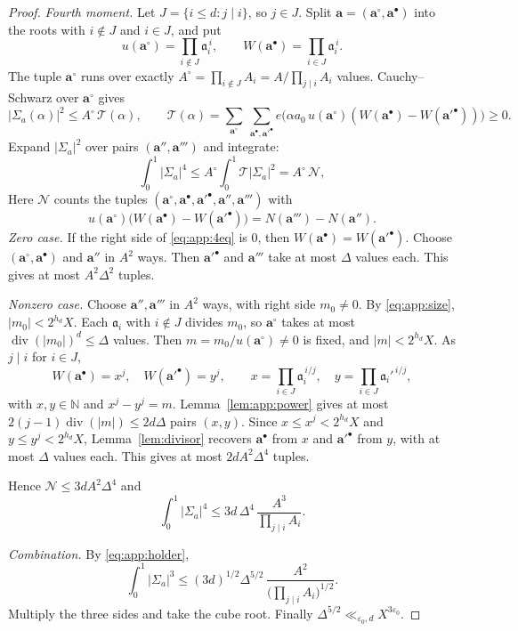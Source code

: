 \documentclass{amsart}
\theoremstyle{definition}
\theoremstyle{plain}
\numberwithin{equation}{section}
\numberwithin{table}{section}
\newcommand{\N}{\mathbb{N}}
\begin{document}
\begin{proof}
\emph{Fourth moment.} Let $J=\{i\le d:j\mid i\}$, so $j\in J$. Split
$\mathbf a=(\mathbf a^\circ,\mathbf a^\bullet)$ into the roots with
$i\notin J$ and $i\in J$, and put
\[
 u(\mathbf a^\circ)=\prod_{i\notin J}\mathfrak a_i^{\,i},\qquad
 W(\mathbf a^\bullet)=\prod_{i\in J}\mathfrak a_i^{\,i}.
\]
The tuple $\mathbf a^\circ$ runs over exactly
$A^\circ=\prod_{i\notin J}A_i=A/\prod_{j\mid i}A_i$ values. Cauchy--Schwarz
over $\mathbf a^\circ$ gives
\[
 |\Sigma_a(\alpha)|^2\le A^\circ\,\mathcal T(\alpha),\qquad
 \mathcal T(\alpha)=\sum_{\mathbf a^\circ}\
 \sum_{\mathbf a^\bullet,\mathbf a'^\bullet}
 e\bigl(\alpha a_0\,u(\mathbf a^\circ)
 (W(\mathbf a^\bullet)-W(\mathbf a'^\bullet))\bigr)\ge0 .
\]
Expand $|\Sigma_a|^2$ over pairs $(\mathbf a'',\mathbf a''')$ and
integrate:
\[
 \int_0^1|\Sigma_a|^4\le A^\circ\int_0^1\mathcal T|\Sigma_a|^2
 =A^\circ\,\mathcal N,
\]
Here $\mathcal N$ counts the tuples
$(\mathbf a^\circ,\mathbf a^\bullet,\mathbf a'^\bullet,\mathbf a'',\mathbf a''')$
with
\begin{equation}\label{eq:app:4eq}
 u(\mathbf a^\circ)\bigl(W(\mathbf a^\bullet)-W(\mathbf a'^\bullet)\bigr)
 =N(\mathbf a''')-N(\mathbf a'').
\end{equation}
\emph{Zero case.} If the right side of \eqref{eq:app:4eq} is $0$, then
$W(\mathbf a^\bullet)=W(\mathbf a'^\bullet)$. Choose
$(\mathbf a^\circ,\mathbf a^\bullet)$ and $\mathbf a''$ in $A^2$ ways. Then
$\mathbf a'^\bullet$ and $\mathbf a'''$ take at most $\Delta$ values each.
This gives at most $A^2\Delta^2$ tuples.

\emph{Nonzero case.} Choose $\mathbf a'',\mathbf a'''$ in $A^2$ ways, with
right side $m_0\ne0$. By \eqref{eq:app:size}, $|m_0|<2^{h_d}X$. Each
$\mathfrak a_i$ with $i\notin J$ divides $m_0$, so $\mathbf a^\circ$ takes at
most $\operatorname{div}(|m_0|)^d\le\Delta$ values. Then
$m=m_0/u(\mathbf a^\circ)\ne0$ is fixed, and $|m|<2^{h_d}X$. As $j\mid i$ for
$i\in J$,
\[
 W(\mathbf a^\bullet)=x^j,\quad W(\mathbf a'^\bullet)=y^j,\qquad
 x=\prod_{i\in J}\mathfrak a_i^{\,i/j},\quad
 y=\prod_{i\in J}\mathfrak a_i'^{\,i/j},
\]
with $x,y\in\N$ and $x^j-y^j=m$. Lemma~\ref{lem:app:power} gives at most
$2(j-1)\operatorname{div}(|m|)\le2d\Delta$ pairs $(x,y)$. Since
$x\le x^j<2^{h_d}X$ and $y\le y^j<2^{h_d}X$, Lemma~\ref{lem:divisor} recovers
$\mathbf a^\bullet$ from $x$ and $\mathbf a'^\bullet$ from $y$, with at most
$\Delta$ values each. This gives at most $2dA^2\Delta^4$ tuples.

Hence $\mathcal N\le3dA^2\Delta^4$ and
\[
 \int_0^1|\Sigma_a|^4\le3d\,\Delta^4\,\frac{A^3}{\prod_{j\mid i}A_i}.
\]

\emph{Combination.} By \eqref{eq:app:holder},
\[
 \int_0^1|\Sigma_a|^3\le(3d)^{1/2}\Delta^{5/2}\,
 \frac{A^2}{\bigl(\prod_{j\mid i}A_i\bigr)^{1/2}} .
\]
Multiply the three sides and take the cube root. Finally
$\Delta^{5/2}\ll_{\varepsilon_0,d}X^{3\varepsilon_0}$.
\end{proof}
\end{document}
